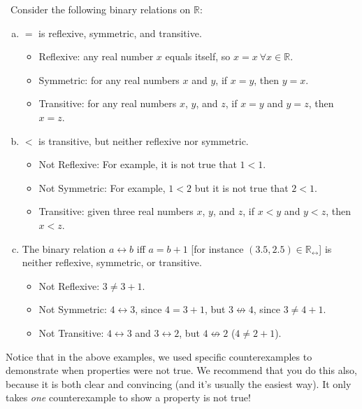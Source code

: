 \begin{eg} \ 
Consider the following binary relations on ${\mathbb R}$:
\begin{enumerate}[(a)]
\item $=$ is reflexive, symmetric, and transitive.
\begin{itemize}
\item 
Reflexive:  any real number $x$ equals itself, so $x=x~\forall x \in {\mathbb R}$.
\item
Symmetric:  for any real numbers $x$ and $y$, if $x = y$, then $y = x$. 
\item
Transitive:  for any real numbers $x$, $y$, and $z$, if $x = y$ and $y = z$, then $x = z$.
\end{itemize}
\item $<$ is transitive, but neither reflexive nor symmetric.
\begin{itemize}
\item
Not Reflexive:  For example, it is not true that $1 < 1$.
\item
Not Symmetric:  For example, $1 < 2$ but it is not true that $2 < 1$.
\item
Transitive:  given three real numbers $x$, $y$, and $z$, if $x < y$ and $y < z$, then $x < z$.
\end{itemize}
\item
The binary relation $a \rel b$ iff $a = b + 1$ [for instance $(3.5,2.5) \in {\mathbb R}_\rel$] is neither reflexive, symmetric, or transitive.
\begin{itemize}
\item
Not Reflexive:  $3 \neq 3 + 1$.
\item
Not Symmetric:  $4 \rel 3$, since $4 = 3 + 1$, but $3 \not\rel 4$, since $3 \neq 4 + 1$.
\item
Not Transitive:  $4 \rel 3$ and $3 \rel 2$, but $4 \not\rel 2$ ($4 \neq 2 + 1$).
\end{itemize}  
\end{enumerate}
\end{eg}

Notice that in the above examples, we used specific counterexamples to demonstrate when properties were not true.  We recommend that you do this also, because it is both clear and convincing (and it's usually the easiest way). It only takes \emph{one} counterexample to show a property is not true! 

